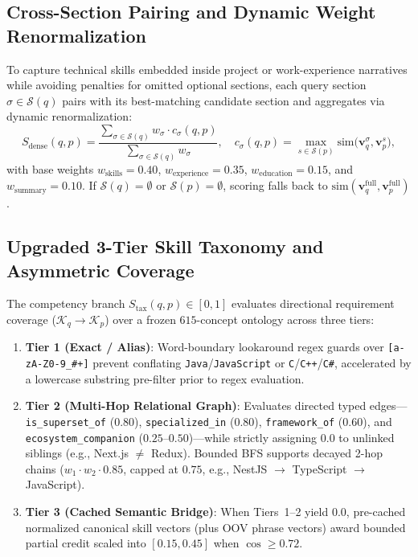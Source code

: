 \subsection{Cross-Section Pairing and Dynamic Weight Renormalization}
To capture technical skills embedded inside project or work-experience narratives while avoiding penalties for omitted optional sections, each query section $\sigma \in \mathcal{S}(q)$ pairs with its best-matching candidate section and aggregates via dynamic renormalization:
\begin{equation}
    S_{\text{dense}}(q, p) = \frac{\sum_{\sigma \in \mathcal{S}(q)} w_\sigma \cdot c_\sigma(q, p)}{\sum_{\sigma \in \mathcal{S}(q)} w_\sigma}, \quad c_\sigma(q, p) = \max_{s \in \mathcal{S}(p)} \text{sim}\big(\mathbf{v}_q^\sigma, \mathbf{v}_p^s\big),
    \label{eq:cross_dynamic}
\end{equation}
with base weights $w_{\text{skills}} = 0.40$, $w_{\text{experience}} = 0.35$, $w_{\text{education}} = 0.15$, and $w_{\text{summary}} = 0.10$. If $\mathcal{S}(q) = \emptyset$ or $\mathcal{S}(p) = \emptyset$, scoring falls back to $\text{sim}(\mathbf{v}_q^{\text{full}}, \mathbf{v}_p^{\text{full}})$.

\subsection{Upgraded 3-Tier Skill Taxonomy and Asymmetric Coverage}
The competency branch $S_{\text{tax}}(q, p) \in [0, 1]$ evaluates directional requirement coverage ($\mathcal{K}_q \rightarrow \mathcal{K}_p$) over a frozen $615$-concept ontology across three tiers:
\begin{enumerate}
    \item \textbf{Tier 1 (Exact / Alias)}: Word-boundary lookaround regex guards over \texttt{[a-zA-Z0-9\_\#+]} prevent conflating \texttt{Java}/\texttt{JavaScript} or \texttt{C}/\texttt{C++}/\texttt{C\#}, accelerated by a lowercase substring pre-filter prior to regex evaluation.
    \item \textbf{Tier 2 (Multi-Hop Relational Graph)}: Evaluates directed typed edges---\texttt{is\_superset\_of} ($0.80$), \texttt{specialized\_in} ($0.80$), \texttt{framework\_of} ($0.60$), and \texttt{ecosystem\_companion} ($0.25$--$0.50$)---while strictly assigning $0.0$ to unlinked siblings (e.g., Next.js $\neq$ Redux). Bounded BFS supports decayed 2-hop chains ($w_1 \cdot w_2 \cdot 0.85$, capped at $0.75$, e.g., NestJS $\rightarrow$ TypeScript $\rightarrow$ JavaScript).
    \item \textbf{Tier 3 (Cached Semantic Bridge)}: When Tiers~1--2 yield $0.0$, pre-cached normalized canonical skill vectors (plus OOV phrase vectors) award bounded partial credit scaled into $[0.15, 0.45]$ when $\cos \ge 0.72$.
\end{enumerate}

